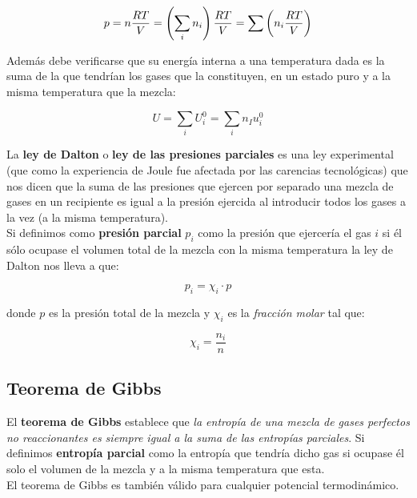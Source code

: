 \documentclass[12pt,a4paper,oneside]{book}
\begin{document}
\begin{equation}
p = n \dfrac{RT}{V} = \left( \sum_i n_i \right) \dfrac{RT}{V} = \sum \left(  n_i \dfrac{RT}{V} \right)
\end{equation}

Además debe verificarse que su energía interna a una temperatura dada es la suma de la que tendrían los gases que la constituyen, en un estado puro y a la misma temperatura que la mezcla:

\begin{equation}
U = \sum_i U_i^0 = \sum_i n_I u_i^0
\end{equation}

La \textbf{ley de Dalton} o \textbf{ley de las presiones parciales} es una ley experimental (que como la experiencia de Joule fue afectada por las carencias tecnológicas) que nos dicen que la suma de las presiones que ejercen por separado una mezcla de gases en un recipiente es igual a la presión ejercida al introducir todos los gases a la vez (a la misma temperatura). \\

Si definimos como \textbf{presión parcial} $p_i$ como la presión que ejercería el gas $i$ si él sólo ocupase el volumen total de la mezcla con la misma temperatura la ley de Dalton nos lleva a que:

\begin{equation}
p_i = \chi_i \cdot p
\end{equation}

donde $p$ es la presión total de la mezcla y $\chi_i$ es la \textit{fracción molar} tal que:

\begin{equation}
\chi_i = \frac{n_i}{n}
\end{equation}

\subsection{Teorema de Gibbs}

El \textbf{teorema de Gibbs} establece que \textit{la entropía de una mezcla de gases perfectos no reaccionantes es siempre igual a la suma de las entropías parciales}. Si definimos \textbf{entropía parcial} como la entropía que tendría dicho gas si ocupase él solo el volumen de la mezcla y a la misma temperatura que esta. \\

El teorema de Gibbs es también válido para cualquier potencial termodinámico. 
\end{document}
